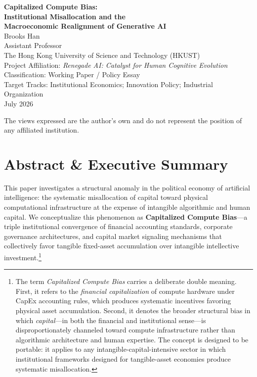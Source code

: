 \documentclass[11pt,letterpaper]{article}
\begin{document}
\begin{titlepage}
\vspace*{3cm}
\begin{center}
{\LARGE\bfseries Capitalized Compute Bias:\\[8pt]
Institutional Misallocation and the\\[4pt]
Macroeconomic Realignment of Generative AI}\\[24pt]

{\large Brooks Han}\\[6pt]
{\normalsize Assistant Professor}\\[2pt]
{\normalsize The Hong Kong University of Science and Technology (HKUST)}\\[18pt]

{\normalsize Project Affiliation: \textit{Renegade AI: Catalyst for Human Cognitive Evolution}}\\[18pt]

{\normalsize Classification: Working Paper / Policy Essay}\\[4pt]
{\normalsize Target Tracks: Institutional Economics; Innovation Policy; Industrial Organization}\\[24pt]

{\normalsize July 2026}
\end{center}

\vfill
\begin{flushleft}
{\footnotesize The views expressed are the author's own and do not represent the position of any affiliated institution.}
\end{flushleft}
\end{titlepage}

\section*{Abstract \& Executive Summary}

This paper investigates a structural anomaly in the political economy of artificial intelligence: the systematic misallocation of capital toward physical computational infrastructure at the expense of intangible algorithmic and human capital. We conceptualize this phenomenon as \textbf{Capitalized Compute Bias}---a triple institutional convergence of financial accounting standards, corporate governance architectures, and capital market signaling mechanisms that collectively favor tangible fixed-asset accumulation over intangible intellective investment.\footnote{The term \textit{Capitalized Compute Bias} carries a deliberate double meaning. First, it refers to the \textit{financial capitalization} of compute hardware under CapEx accounting rules, which produces systematic incentives favoring physical asset accumulation. Second, it denotes the broader structural bias in which \textit{capital}---in both the financial and institutional sense---is disproportionately channeled toward compute infrastructure rather than algorithmic architecture and human expertise. The concept is designed to be portable: it applies to any intangible-capital-intensive sector in which institutional frameworks designed for tangible-asset economies produce systematic misallocation.}
\end{document}
